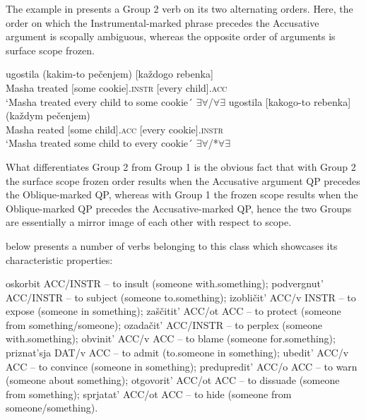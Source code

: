 \documentclass[output=paper,colorlinks,citecolor=brown]{./langscibook}
\begin{document}
The example in  presents a Group 2 verb on its two alternating orders. Here, the order on which the Instrumental-marked phrase precedes the Accusative argument is scopally ambiguous, whereas the opposite order of arguments is surface scope frozen. 


\ea%
    \label{ex:antonyuk:15}
    \ea \label{ex:antonyuk:15a}
       {ugostila} {(kakim-to} {pečenjem)}  {[každogo} {rebenka]}\\
    Masha treated  [some        cookie].\textsc{instr} [every child].\textsc{acc}\\
    \glt `Masha treated every child to some cookie´ \hfill ${\exists}{\forall}$/${\forall}{\exists}$
    \ex \label{ex:antonyuk:15b}
       {ugostila} {[kakogo-to} {rebenka]}    {(každym} {pečenjem)}\\
    Masha reated    [some child].\textsc{acc} [every    cookie].\textsc{instr}\\
    \glt `Masha treated some child to every cookie´ \hfill ${\exists}{\forall}$/*${\forall}{\exists}$
    \z
\z

What differentiates Group 2 from Group 1 is the obvious fact that with Group 2 the surface scope frozen order results when the Accusative argument QP precedes the Oblique-marked QP, whereas with Group 1 the frozen scope results when the Oblique-marked QP precedes the Accusative-marked QP, hence the two Groups are essentially a mirror image of each other with respect to scope.

 below presents a number of verbs belonging to this class which showcases its characteristic properties:

\ea%
    \label{ex:antonyuk:16}
    \ea \label{ex:antonyuk:16a}
    oskorbit ACC/INSTR – to insult (someone with.something);
    \ex \label{ex:antonyuk:16b}
    podvergnut’ ACC/INSTR – to subject (someone to.something);
    \ex \label{ex:antonyuk:16c}
    izobličit’ ACC/v INSTR – to expose (someone in something);
    \ex \label{ex:antonyuk:16d}
    zaščitit’ ACC/ot ACC – to protect (someone from something/someone);
    \ex \label{ex:antonyuk:16e}
    ozadačit’ ACC/INSTR – to perplex (someone with.something);
    \ex \label{ex:antonyuk:16f}
    obvinit’ ACC/v ACC – to blame (someone for.something);
    \ex \label{ex:antonyuk:16g}
    priznat’sja DAT/v ACC – to admit (to.someone in something);
    \ex \label{ex:antonyuk:16h}
    ubedit’ ACC/v ACC – to convince (someone in something);
    \ex \label{ex:antonyuk:16i}
    predupredit’ ACC/o ACC – to warn (someone about something);
    \ex \label{ex:antonyuk:16j}
    otgovorit’ ACC/ot ACC – to dissuade (someone from something);
    \ex \label{ex:antonyuk:16k}
    sprjatat’ ACC/ot ACC – to hide (someone from someone/something).
    \z
\z
\end{document}

